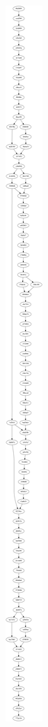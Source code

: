 \documentclass[cjk,dvipdfmx,20pt]{beamer}
\begin{document}
\begin{frame}{}
\begin{center}
\includegraphics[width=0.2\hsize]{image200812/git-dot.png}
\end{center}
\end{frame}
\end{document}
